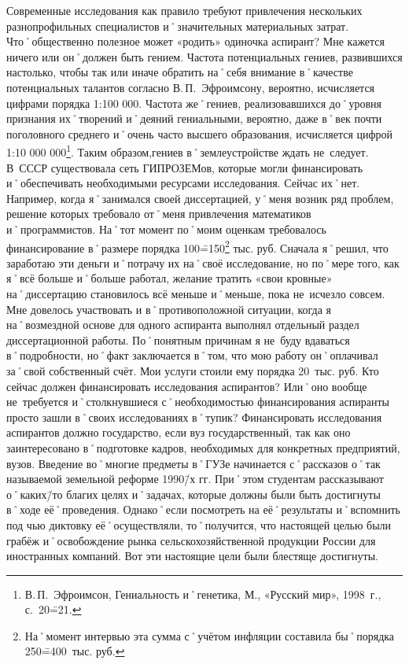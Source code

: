 \begin{drama}
	\maxspeaks Современные исследования как правило требуют привлечения нескольких разнопрофильных специалистов и˚значительных материальных затрат. Что˚общественно полезное может  «родить» одиночка аспирант? Мне кажется ничего или он˚должен быть гением. Частота потенциальных гениев, развившихся настолько, чтобы так или иначе обратить на˚себя внимание в˚качестве потенциальных талантов согласно В.\,П.~Эфроимсону, вероятно, исчисляется цифрами порядка 1:100 000. Частота же˚гениев, реализовавшихся до˚уровня признания их˚творений и˚деяний гениальными, вероятно, даже в˚век почти поголовного среднего и˚очень часто высшего образования, исчисляется цифрой 1:10 000 000\footnote{В.\,П.~Эфроимсон, Гениальность и˚генетика, М., «Русский мир», 1998~г., с.~20\==21.}. Таким образом,гениев в˚землеустройстве ждать не~следует. 
	В~СССР существовала сеть ГИПРОЗЕМов, которые могли финансировать и˚обеспечивать необходимыми ресурсами исследования. Сейчас их˚нет. Например, когда я˚занимался своей диссертацией, у˚меня возник ряд проблем, решение которых требовало от˚меня привлечения математиков и˚программистов. На˚тот момент по˚моим оценкам требовалось финансирование в˚размере порядка 100\==150\footnote{На˚момент интервью эта сумма с˚учётом инфляции составила бы˚порядка 250\==400~тыс. руб.} тыс. руб. Сначала я˚решил, что заработаю эти деньги и˚потрачу их на˚своё исследование, но по˚мере того, как я˚всё больше и˚больше работал, желание тратить  «свои кровные» на˚диссертацию становилось всё меньше и˚меньше, пока не~исчезло совсем. Мне довелось участвовать и в˚противоположной ситуации, когда я на˚возмездной основе для одного аспиранта выполнял отдельный раздел диссертационной работы. По˚понятным причинам я не~буду вдаваться в˚подробности, но˚факт заключается в˚том, что мою работу он˚оплачивал за˚свой собственный счёт. Мои услуги стоили ему порядка 20~тыс. руб. 
	Кто сейчас должен финансировать исследования аспирантов? Или˚оно вообще не~требуется и˚столкнувшиеся с˚необходимостью финансирования аспиранты просто зашли в˚своих исследованиях в˚тупик?
	\michaelspeaks Финансировать исследования аспирантов должно государство, если вуз государственный, так как оно заинтересовано в˚подготовке кадров, необходимых для конкретных предприятий, вузов.
	\maxspeaks Введение во˚многие предметы в˚ГУЗе начинается с˚рассказов о˚так называемой земельной реформе 1990\=/х гг. При˚этом студентам рассказывают о˚каких\=/то благих целях и˚задачах, которые должны были быть достигнуты в˚ходе её˚проведения. Однако˚если посмотреть на её˚результаты и˚вспомнить под чью диктовку её˚осуществляли, то˚получится, что настоящей целью были грабёж и˚освобождение рынка сельскохозяйственной продукции России для иностранных компаний. Вот эти настоящие цели были блестяще достигнуты. 

\end{drama}
